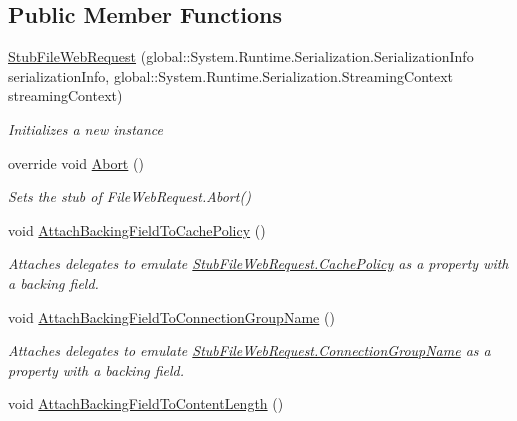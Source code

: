 \subsection*{Public Member Functions}
\begin{DoxyCompactItemize}
\item 
\hyperlink{class_system_1_1_net_1_1_fakes_1_1_stub_file_web_request_ad0f9a674a8e13951bd92d8efda82be8c}{Stub\-File\-Web\-Request} (global\-::\-System.\-Runtime.\-Serialization.\-Serialization\-Info serialization\-Info, global\-::\-System.\-Runtime.\-Serialization.\-Streaming\-Context streaming\-Context)
\begin{DoxyCompactList}\small\item\em Initializes a new instance\end{DoxyCompactList}\item 
override void \hyperlink{class_system_1_1_net_1_1_fakes_1_1_stub_file_web_request_ac5d66a406253aeda659b02f4fc1f5eca}{Abort} ()
\begin{DoxyCompactList}\small\item\em Sets the stub of File\-Web\-Request.\-Abort()\end{DoxyCompactList}\item 
void \hyperlink{class_system_1_1_net_1_1_fakes_1_1_stub_file_web_request_a9c7c4e1fc9c0da2b190d530e19157581}{Attach\-Backing\-Field\-To\-Cache\-Policy} ()
\begin{DoxyCompactList}\small\item\em Attaches delegates to emulate \hyperlink{class_system_1_1_net_1_1_fakes_1_1_stub_file_web_request_a94c7beed3e83de5af05d25766ffac0f8}{Stub\-File\-Web\-Request.\-Cache\-Policy} as a property with a backing field.\end{DoxyCompactList}\item 
void \hyperlink{class_system_1_1_net_1_1_fakes_1_1_stub_file_web_request_aaa537abc87b56c769d0fa4e485fd380b}{Attach\-Backing\-Field\-To\-Connection\-Group\-Name} ()
\begin{DoxyCompactList}\small\item\em Attaches delegates to emulate \hyperlink{class_system_1_1_net_1_1_fakes_1_1_stub_file_web_request_a3f3190901f9122790c150ce4a4fb73a3}{Stub\-File\-Web\-Request.\-Connection\-Group\-Name} as a property with a backing field.\end{DoxyCompactList}\item 
void \hyperlink{class_system_1_1_net_1_1_fakes_1_1_stub_file_web_request_a2baa641c225e42c23404a2d995fa97d0}{Attach\-Backing\-Field\-To\-Content\-Length} ()

\end{DoxyCompactItemize}

